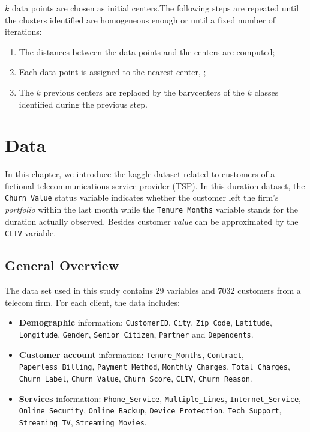 \documentclass[
]{book}
\providecommand{\tightlist}{%
  \setlength{\itemsep}{0pt}\setlength{\parskip}{0pt}}
\begin{document}
\(k\) data points are chosen as initial centers.The following steps are repeated until the clusters identified are homogeneous enough or until a fixed number of iterations:

\begin{enumerate}
\def\labelenumi{\arabic{enumi}.}
\tightlist
\item
  The distances between the data points and the centers are computed;
\item
  Each data point is assigned to the nearest center, ;
\item
  The \(k\) previous centers are replaced by the barycenters of the \(k\) classes identified during the previous step.
\end{enumerate}

\hypertarget{data}{%
\chapter{Data}\label{data}}

In this chapter, we introduce the \href{https://www.kaggle.com/yeanzc/telco-customer-churn-ibm-dataset}{kaggle} dataset related to customers of a fictional telecommunications service provider (TSP). In this duration dataset, the \texttt{Churn\_Value} status variable indicates whether the customer left the firm's \emph{portfolio} within the last month while the \texttt{Tenure\_Months} variable stands for the duration actually observed. Besides customer \emph{value} can be approximated by the \texttt{CLTV} variable.

\hypertarget{general-overview}{%
\section{General Overview}\label{general-overview}}

The data set used in this study contains 29 variables and 7032 customers from a telecom firm. For each client, the data includes:

\begin{itemize}
\item
  \textbf{Demographic} information: \texttt{CustomerID}, \texttt{City}, \texttt{Zip\_Code}, \texttt{Latitude}, \texttt{Longitude}, \texttt{Gender}, \texttt{Senior\_Citizen}, \texttt{Partner} and \texttt{Dependents}.
\item
  \textbf{Customer account} information: \texttt{Tenure\_Months}, \texttt{Contract}, \texttt{Paperless\_Billing}, \texttt{Payment\_Method}, \texttt{Monthly\_Charges}, \texttt{Total\_Charges}, \texttt{Churn\_Label}, \texttt{Churn\_Value}, \texttt{Churn\_Score}, \texttt{CLTV}, \texttt{Churn\_Reason}.
\item
  \textbf{Services} information: \texttt{Phone\_Service}, \texttt{Multiple\_Lines}, \texttt{Internet\_Service}, \texttt{Online\_Security}, \texttt{Online\_Backup}, \texttt{Device\_Protection}, \texttt{Tech\_Support}, \texttt{Streaming\_TV}, \texttt{Streaming\_Movies}.
\end{itemize}
\end{document}
